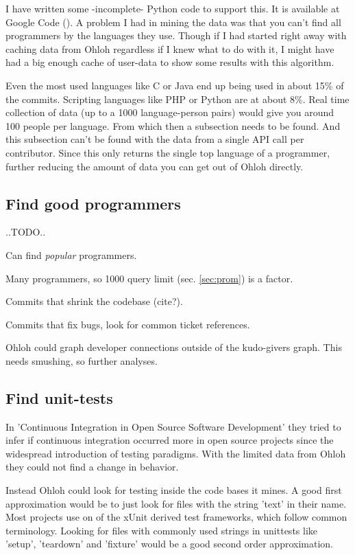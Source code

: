 \documentclass{sig-alternate}
\begin{document}
I have written some -incomplete- Python code to support this. It is available at Google Code (\cite{pyanohloh}). A problem I had in mining the data was that you can't find all programmers by the languages they use. Though if I had started right away with caching data from Ohloh regardless if I knew what to do with it, I might have had a big enough cache of user-data to show some results with this algorithm.

Even the most used languages like C or Java end up being used in about 15\% of the commits. Scripting languages like PHP or Python are at about 8\%. Real time collection of data (up to a 1000 language-person pairs) would give you around 100 people per language. From which then a subsection needs to be found. And this subsection can't be found with the data from a single API call per contributor. Since this only returns the single top language of a programmer, further reducing the amount of data you can get out of Ohloh directly.

\subsection{Find good programmers}

..TODO..

Can find \emph{popular} programmers.

Many programmers, so 1000 query limit (sec. \ref{sec:prom}) is a factor.

Commits that shrink the codebase (cite?).

Commits that fix bugs, look for common ticket references.

Ohloh could graph developer connections outside of the kudo-givers graph. This needs smushing, so further  analyses.


\subsection{Find unit-tests}\label{find-unittest}
In 'Continuous Integration in Open Source Software Development' \cite{Deshpande:2008p4463} they tried to infer if continuous integration occurred more in open source projects since the widespread introduction of testing paradigms. With the limited data from Ohloh they could not find a change in behavior.

Instead Ohloh could look for testing inside the code bases it mines. A good first approximation would be to just look for files with the string 'text' in their name. Most projects use on of the xUnit derived test frameworks, which follow common terminology. Looking for files with commonly used strings in unittests like 'setup', 'teardown' and 'fixture' would be a good second order approximation.
\end{document}
